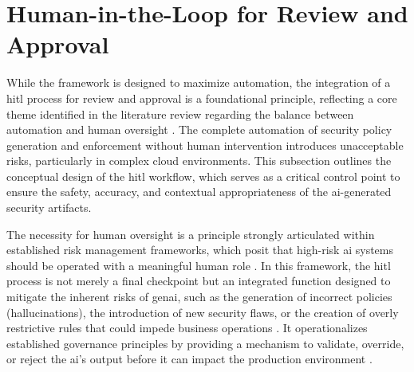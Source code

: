 

\section{Human-in-the-Loop for Review and Approval} %
\label{sub:Human-in-the-Loop for Review and Approval}

While the framework is designed to maximize automation, the integration of a \gls{hitl} process for review and approval is a foundational principle, reflecting a core theme identified in the literature review regarding the balance between automation and human oversight  \cite{nicosia_risk_nodate}. The complete automation of security policy generation and enforcement without human intervention introduces unacceptable risks, particularly in complex cloud environments. This subsection outlines the conceptual design of the \gls{hitl} workflow, which serves as a critical control point to ensure the safety, accuracy, and contextual appropriateness of the \gls{ai}-generated security artifacts.

The necessity for human oversight is a principle strongly articulated within established risk management frameworks, which posit that high-risk \gls{ai} systems should be operated with a meaningful human role \cite{nicosia_risk_nodate}. In this framework, the \gls{hitl} process is not merely a final checkpoint but an integrated function designed to mitigate the inherent risks of \gls{genai}, such as the generation of incorrect policies (hallucinations), the introduction of new security flaws, or the creation of overly restrictive rules that could impede business operations  \cite{nicosia_risk_nodate}. It operationalizes established governance principles by providing a mechanism to validate, override, or reject the \gls{ai}'s output before it can impact the production environment \cite{noauthor_human---loop_nodate}.

